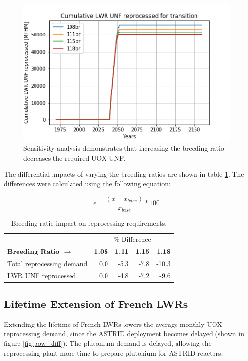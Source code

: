 \begin{figure}[htbp!]
    \begin{center}
        \includegraphics[scale=0.6]{./images/sensitivity/br_uox_unf_cum.png}
    \end{center}
    \caption{Sensitivity analysis demonstrates that increasing the breeding 
    ratio decreases the required \gls{UOX} \gls{UNF}. }
    \label{fig:br_uox}
\end{figure}

The differential impacts of varying the breeding ratios are
shown in table \ref{tab:br_diff}. The differences were calculated
using the following equation:

\[ \epsilon = \frac{(x - x_{base})}{x_{base}} * 100 \]

\begin{table}[h]
	\centering
        \caption{Breeding ratio impact on reprocessing requirements.}
	\begin{tabular}{lrrrr}
		\hline
                & \multicolumn{4}{c}{\% Difference} \\
		\textbf{Breeding Ratio $\longrightarrow$}& \textbf{1.08}& \textbf{1.11} & \textbf{1.15} & \textbf{1.18} \\
		\hline
		Total reprocessing demand & 0.0 & -5.3 & -7.8 & -10.3 \\ 
		\gls{LWR} \gls{UNF} reprocessed & 0.0  & -4.8 & -7.2 & -9.6 \\
		\hline
	\end{tabular}
	\label{tab:br_diff}
\end{table}


\subsection{Lifetime Extension of French \glspl{LWR}}\label{sec:life}
Extending the lifetime of French \glspl{LWR} lowers the average
monthly \gls{UOX} reprocessing demand, since the \gls{ASTRID} deployment becomes 
delayed (shown in figure \ref{fig:pow_diff}). The plutonium demand is delayed,
 allowing the reprocessing plant more time to prepare plutonium for \gls{ASTRID} reactors.

